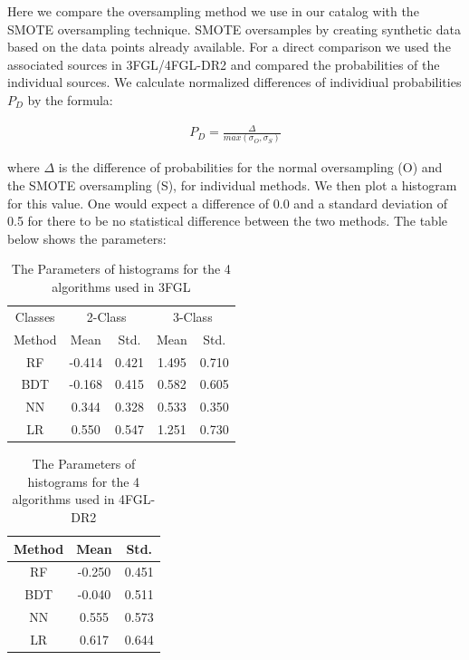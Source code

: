 Here we compare the oversampling method we use in our catalog with the SMOTE oversampling technique. SMOTE oversamples by creating synthetic data based on the data points already available. For a direct comparison we used the associated sources in 3FGL/4FGL-DR2 and compared the probabilities of the individual sources. We calculate normalized differences of individiual probabilities $P_{D}$ by the formula:

\begin{align}
P_{D}= \frac{\Delta}{max(\sigma_{O},\sigma_{S})}
\end{align}

where $\Delta$ is the difference of probabilities for the normal oversampling (O) and the SMOTE oversampling (S), for individual methods. We then plot a histogram for this value. One would expect a difference of 0.0 and a standard deviation of 0.5 for there to be no statistical difference between the two methods. The table below shows the parameters:
\begin{table}[!h]
\tiny
\centering
\renewcommand{\tabcolsep}{1mm}
\renewcommand{\arraystretch}{1.3}

\begin{tabular}{c c c c c }
\hline
\hline
Classes&\multicolumn{2}{c}{2-Class}&\multicolumn{2}{c}{3-Class}\\
Method & Mean&Std.&Mean&Std.\\
\hline
RF& -0.414 & 0.421&1.495&0.710\\
\hline
BDT&-0.168&0.415 &0.582&0.605\\
\hline
NN&0.344&0.328&0.533&0.350\\
\hline
LR&0.550&0.547&1.251&0.730\\
\end{tabular}
\vspace{2mm}
\caption{The Parameters of histograms for the 4 algorithms used in 3FGL
}
\label{tab:compO}
\end{table}





\begin{table}[!h]
\tiny
\centering
\renewcommand{\tabcolsep}{1mm}
\renewcommand{\arraystretch}{1}

\begin{tabular}{c c c}
\hline
\hline
Method & Mean&Std.\\
\hline
RF& -0.250 & 0.451\\
\hline
BDT&-0.040&0.511 \\
\hline
NN&0.555&0.573\\
\hline
LR&0.617&0.644\\
\end{tabular}
\vspace{2mm}
\caption{The Parameters of histograms for the 4 algorithms used in 4FGL-DR2
}
\label{tab:compO}
\end{table}

